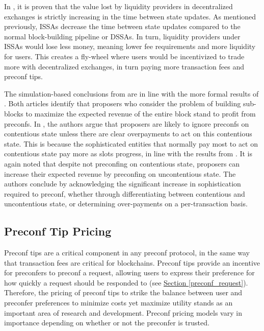 \documentclass[a4paper]{article}
\theoremstyle{boldstyle}
\newcommand{\todoks}[1]{\todo[color=purple!40]{\textbf{Katerina:} #1}}
\begin{document}
    In \cite{LVRwithFees}, it is proven that the value lost by liquidity providers in decentralized exchanges is strictly increasing in the time between state updates. As mentioned previously, ISSAs decrease the time between state updates compared to the normal block-building pipeline or DSSAs. In turn, liquidity providers under ISSAs would lose less money, meaning lower fee requirements and more liquidity for users. This creates a fly-wheel where users would be incentivized to trade more with decentralized exchanges, in turn paying more transaction fees and preconf tips.
    
    
    The simulation-based conclusions from \cite{W:PreconfirmationsundertheNOlens} are in line with the more formal results of \cite{W:AnalysingExpectedProposerRevenuefromPreconfirmations}. Both articles identify that proposers who consider the problem of building sub-blocks to maximize the expected revenue of the entire block stand to profit from preconfs. In \cite{W:PreconfirmationsundertheNOlens}, the authors argue that proposers  are likely to ignore preconfs on contentious state unless there are clear overpayments to act on this contentious state. This is because the sophisticated entities that normally pay most to act on contentious state pay more as slots progress, in line with the results from \cite{LVRwithFees}. It is again noted that despite not preconfing on contentious state, proposers can increase their expected revenue by preconfing on uncontentious state. The authors conclude by acknowledging the significant increase in sophistication required to preconf, whether through differentiating between contentious and uncontentious state, or determining over-payments on a per-transaction basis.  
    
    \subsection{Preconf Tip Pricing}
    \label{sec:price}
    
     Preconf tips are a critical component in any preconf protocol, in the same way that transaction fees are critical for blockchains. Preconf tips provide an incentive for preconfers to preconf a request, allowing users to express their preference for how quickly a request should be responded to (see \hyperref[preconf_request]{Section \ref{preconf_request}}). Therefore, the pricing of preconf tips to strike the balance between user and preconfer preferences to minimize costs yet maximize utility stands as an important area of research and development. Preconf pricing models vary in importance depending on whether or not the preconfer is trusted. 
     
\end{document}
